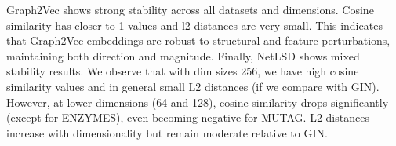 Graph2Vec shows strong stability across all datasets and dimensions.
Cosine similarity has closer to 1 values and l2 distances are very small.
This indicates that Graph2Vec embeddings are robust to structural and feature perturbations,
maintaining both direction and magnitude. Finally, NetLSD shows mixed stability results. We observe that with dim sizes 256,
we have high cosine similarity values and in general small L2 distances (if we compare with GIN).
However, at lower dimensions (64 and 128), cosine similarity drops significantly (except for ENZYMES), 
even becoming negative for MUTAG. 
L2 distances increase with dimensionality but remain moderate relative to GIN. 



